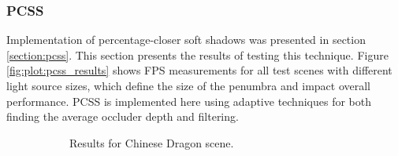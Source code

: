 \subsubsection{PCSS}
Implementation of percentage-closer soft shadows was presented in section \ref{section:pcss}. This section presents the results of testing this technique. Figure \ref{fig:plot:pcss_results} shows FPS measurements for all test scenes with different light source sizes, which define the size of the penumbra and impact overall performance. PCSS is implemented here using adaptive techniques for both finding the average occluder depth and filtering.

\begin{figure}[h]
    \centering
    \begin{subfigure}[t]{0.48\textwidth}
        \caption{Results for Chinese Dragon scene.}
        \label{fig:plot:pcss_dragon}
    \end{subfigure}
    \hfill
    \begin{subfigure}[t]{0.48\textwidth}

\end{subfigure}
\end{figure}
